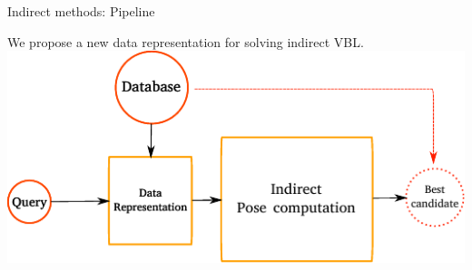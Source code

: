 \begin{frame}{Indirect methods: Pipeline}
	
	We propose a new data representation for solving indirect VBL.
	\vfill	
	\includegraphics{vect/keys_comp_indirect.pdf}
	
\end{frame}


